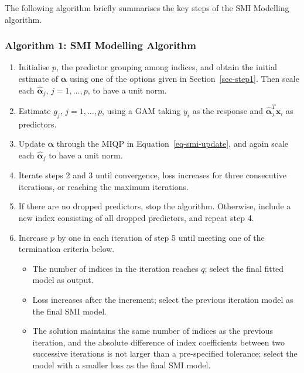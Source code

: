 \documentclass[
  11pt,
  a4paper,
]{article}
\providecommand{\tightlist}{%
  \setlength{\itemsep}{0pt}\setlength{\parskip}{0pt}}\usepackage{longtable,booktabs,array}
\begin{document}
The following algorithm briefly summarises the key steps of the SMI
Modelling algorithm. \newline

\subsubsection*{Algorithm 1: SMI Modelling
Algorithm}\label{algorithm-1-smi-modelling-algorithm}

\begin{enumerate}
\def\labelenumi{\arabic{enumi}.}
\tightlist
\item
  Initialise \(p\), the predictor grouping among indices, and obtain the
  initial estimate of \(\bm{\alpha}\) using one of the options given in
  Section~\ref{sec-step1}. Then scale each \(\hat{\bm{\alpha}}_{j}\),
  \(j=1,\dots,p\), to have a unit norm.
\item
  Estimate \(g_{j}\), \(j=1,\dots,p\), using a GAM taking \(y_{i}\) as
  the response and \(\hat{\bm{\alpha}}_{j}^{T}\bm{x}_{i}\) as
  predictors.
\item
  Update \(\bm{\alpha}\) through the MIQP in
  Equation~\ref{eq-smi-update}, and again scale each
  \(\hat{\bm{\alpha}}_{j}\) to have a unit norm.
\item
  Iterate steps 2 and 3 until convergence, loss increases for three
  consecutive iterations, or reaching the maximum iterations.
\item
  If there are no dropped predictors, stop the algorithm. Otherwise,
  include a new index consisting of all dropped predictors, and repeat
  step 4.
\item
  Increase \(p\) by one in each iteration of step 5 until meeting one of
  the termination criteria below.

  \begin{itemize}
  \tightlist
  \item
    The number of indices in the iteration reaches \(q\); select the
    final fitted model as output.
  \item
    Loss increases after the increment; select the previous iteration
    model as the final SMI model.
  \item
    The solution maintains the same number of indices as the previous
    iteration, and the absolute difference of index coefficients between
    two successive iterations is not larger than a pre-specified
    tolerance; select the model with a smaller loss as the final SMI
    model.
  \end{itemize}
\end{enumerate}
\end{document}

